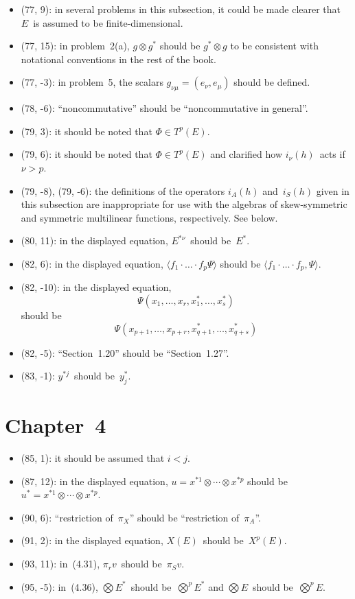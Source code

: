 \documentclass[letterpaper,12pt]{article}
\newcommand{\tprod}{\otimes}
\newcommand{\bigtprod}{\bigotimes}
\newcommand{\sprod}[2]{\langle#1,#2\rangle}
\newcommand{\iprod}[2]{(#1,#2)}
\begin{document}
\begin{itemize}
\item (77, 9): in several problems in this subsection, it could be made clearer that \(E\)~is assumed to be finite-dimensional.
\item (77, 15): in problem~2(a), \(g\tprod g^*\) should be \(g^*\tprod g\) to be consistent with notational conventions in the rest of the book.
\item (77, -3): in problem~5, the scalars \(g_{\nu\mu}=\iprod{e_{\nu}}{e_{\mu}}\) should be defined.
\item (78, -6): ``noncommutative'' should be ``noncommutative in general''.
\item (79, 3): it should be noted that \(\Phi\in T^p(E)\).
\item (79, 6): it should be noted that \(\Phi\in T^p(E)\) and clarified how \(i_{\nu}(h)\)~acts if \(\nu>p\).
\item (79, -8), (79, -6): the definitions of the operators \(i_A(h)\) and~\(i_S(h)\) given in this subsection are inappropriate for use with the algebras of skew-symmetric and symmetric multilinear functions, respectively. See below.
\item (80, 11): in the displayed equation, \(E^{*\nu}\)~should be~\(E^*\).
\item (82, 6): in the displayed equation, \(\langle f_1\cdot\ldots\cdot f_p\Psi\rangle\) should be \(\sprod{f_1\cdot\ldots\cdot f_p}{\Psi}\).
\item (82, -10): in the displayed equation,
\[\Psi(x_1,\ldots,x_r,x^*_1,\ldots,x^*_s)\]
should be
\[\Psi(x_{p+1},\ldots,x_{p+r},x^*_{q+1},\ldots,x^*_{q+s})\]
\item (82, -5): ``Section~1.20'' should be ``Section~1.27''.
\item (83, -1): \(y^{*j}\)~should be~\(y^*_j\).
\end{itemize}

\section*{Chapter~4}
\begin{itemize}
\item (85, 1): it should be assumed that \(i<j\).
\item (87, 12): in the displayed equation, \(u=x^{*1}\tprod\cdots\tprod x^{*p}\) should be \(u^*=x^{*1}\tprod\cdots\tprod x^{*p}\).
\item (90, 6): ``restriction of~\(\pi_X\)'' should be ``restriction of~\(\pi_A\)''.
\item (91, 2): in the displayed equation, \(X(E)\)~should be~\(X^p(E)\).
\item (93, 11): in~(4.31), \(\pi_r v\)~should be~\(\pi_S v\).
\item (95, -5): in~(4.36), \(\bigtprod E^*\)~should be~\(\bigtprod^p E^*\) and \(\bigtprod E\)~should be~\(\bigtprod^p E\).
\end{itemize}
\end{document}
